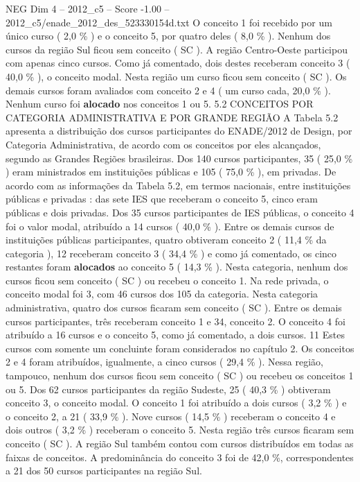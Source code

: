 \begin{textsample}{NEG Dim 4 – 2012\_c5 – Score -1.00 – 2012\_c5/enade\_2012\_des\_523330154d.txt}
O conceito 1 foi recebido por um único curso ( 2,0 \% ) e o conceito 5, por quatro deles ( 8,0 \% ).
Nenhum dos cursos da região Sul ficou sem conceito ( SC ).
A região Centro-Oeste participou com apenas cinco cursos.
Como já comentado, dois destes receberam conceito 3 ( 40,0 \% ), o conceito modal.
Nesta região um curso ficou sem conceito ( SC ).
Os demais cursos foram avaliados com conceito 2 e 4 ( um curso cada, 20,0 \% ).
Nenhum curso foi \textbf{alocado} nos conceitos 1 ou 5. 5.2 CONCEITOS POR CATEGORIA ADMINISTRATIVA E POR GRANDE REGIÃO A Tabela 5.2 apresenta a distribuição dos cursos participantes do ENADE/2012 de Design, por Categoria Administrativa, de acordo com os conceitos por eles alcançados, segundo as Grandes Regiões brasileiras.
Dos 140 cursos participantes, 35 ( 25,0 \% ) eram ministrados em instituições públicas e 105 ( 75,0 \% ), em privadas.
De acordo com as informações da Tabela 5.2, em termos nacionais, entre instituições públicas e privadas : das sete IES que receberam o conceito 5, cinco eram públicas e dois privadas.
Dos 35 cursos participantes de IES públicas, o conceito 4 foi o valor modal, atribuído a 14 cursos ( 40,0 \% ).
Entre os demais cursos de instituições públicas participantes, quatro obtiveram conceito 2 ( 11,4 \% da categoria ), 12 receberam conceito 3 ( 34,4 \% ) e como já comentado, os cinco restantes foram \textbf{alocados} ao conceito 5 ( 14,3 \% ).
Nesta categoria, nenhum dos cursos ficou sem conceito ( SC ) ou recebeu o conceito 1.
Na rede privada, o conceito modal foi 3, com 46 cursos dos 105 da categoria.
Nesta categoria administrativa, quatro dos cursos ficaram sem conceito ( SC ).
Entre os demais cursos participantes, três receberam conceito 1 e 34, conceito 2.
O conceito 4 foi atribuído a 16 cursos e o conceito 5, como já comentado, a dois cursos. 11 Estes cursos com somente um concluinte foram considerados no capítulo 2.
Os conceitos 2 e 4 foram atribuídos, igualmente, a cinco cursos ( 29,4 \% ).
Nessa região, tampouco, nenhum dos cursos ficou sem conceito ( SC ) ou recebeu os conceitos 1 ou 5.
Dos 62 cursos participantes da região Sudeste, 25 ( 40,3 \% ) obtiveram conceito 3, o conceito modal.
O conceito 1 foi atribuído a dois cursos ( 3,2 \% ) e o conceito 2, a 21 ( 33,9 \% ).
Nove cursos ( 14,5 \% ) receberam o conceito 4 e dois outros ( 3,2 \% ) receberam o conceito 5.
Nesta região três cursos ficaram sem conceito ( SC ).
A região Sul também contou com cursos distribuídos em todas as faixas de conceitos.
A predominância do conceito 3 foi de 42,0 \%, correspondentes a 21 dos 50 cursos participantes na região Sul.

\end{textsample}
